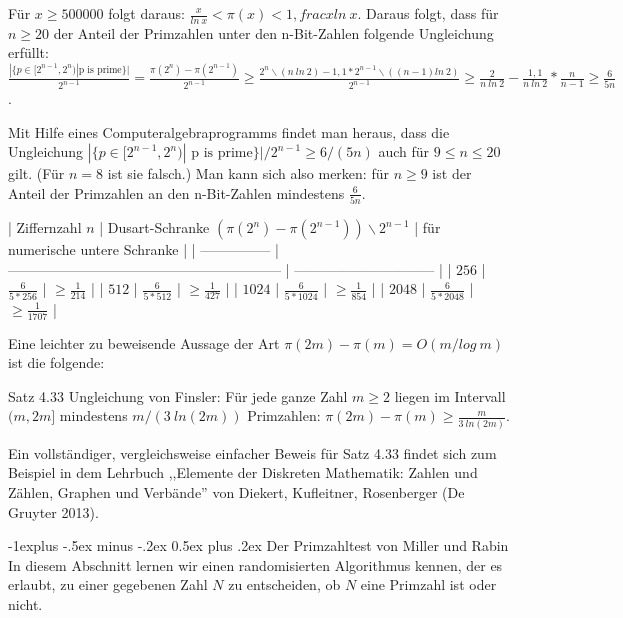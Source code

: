 \documentclass[a4paper]{article}
\makeatletter
\renewcommand{\subsection}{\@startsection{subsection}{2}{0mm}%
 {-1explus -.5ex minus -.2ex}%
 {0.5ex plus .2ex}%
 {\normalfont\normalsize\bfseries}}
\makeatother
\begin{document}
\begin{multicols}{3}
        Für $x\geq 500 000$ folgt daraus: $\frac{x}{ln\ x}< \pi(x)< 1, frac{x}{ln\ x}$.
        Daraus folgt, dass für $n\geq 20$ der Anteil der Primzahlen unter den n-Bit-Zahlen folgende Ungleichung erfüllt: $\frac{|\{p\in [2^{n-1}, 2^n)| \text{p is prime}\}|}{2^{n-1}} = \frac{\pi(2^n)-\pi(2^{n-1})}{2^{n-1}} \geq \frac{2^n\backslash (n\ ln\ 2)- 1,1*2^{n-1}\backslash ((n-1)ln\ 2)}{2^{n-1}}\geq \frac{2}{n\ ln\ 2}-\frac{1,1}{n\ ln\ 2}*\frac{n}{n-1}\geq \frac{6}{5n}$.

        Mit Hilfe eines Computeralgebraprogramms findet man heraus, dass die Ungleichung $|\{p\in [2^{n-1}, 2^n)|\text{ p is prime}\}|/2^{n-1} \geq  6 /(5n)$ auch für $9\leq n\leq 20$ gilt. (Für $n=8$ ist sie falsch.) Man kann sich also merken: für $n\geq 9$ ist der Anteil der Primzahlen an den n-Bit-Zahlen mindestens $\frac{6}{5n}$.

        | Ziffernzahl $n$ | Dusart-Schranke $(\pi(2^n)-\pi(2^{n-1}))\backslash 2^{n-1}$ | für numerische untere Schranke |
        | --------------- | ----------------------------------------------------------- | ------------------------------ |
        | $256$           | $\frac{6}{5*256}$                                           | $\geq \frac{1}{214}$           |
        | $512$           | $\frac{6}{5*512}$                                           | $\geq \frac{1}{427}$           |
        | $1024$          | $\frac{6}{5*1024}$                                          | $\geq\frac{1}{854}$            |
        | $2048$          | $\frac{6}{5*2048}$                                          | $\geq\frac{1}{1707}$           |

        Eine leichter zu beweisende Aussage der Art $\pi(2m)-\pi(m) = O(m/log\ m)$ ist die folgende:

        Satz 4.33 Ungleichung von Finsler: Für jede ganze Zahl $m\geq 2$ liegen im Intervall $(m, 2m]$ mindestens $m/(3\ ln(2m))$ Primzahlen: $\pi (2m)-\pi(m)\geq \frac{m}{3\ ln(2m)}$.

        Ein vollständiger, vergleichsweise einfacher Beweis für Satz 4.33 findet sich zum Beispiel in dem Lehrbuch ,,Elemente der Diskreten Mathematik: Zahlen und Zählen, Graphen und Verbände'' von Diekert, Kufleitner, Rosenberger (De Gruyter 2013).

        \subsection{Der Primzahltest von Miller und Rabin}
        In diesem Abschnitt lernen wir einen randomisierten Algorithmus kennen, der es erlaubt, zu einer gegebenen Zahl $N$ zu entscheiden, ob $N$ eine Primzahl ist oder nicht.


\end{multicols}
\end{document}
